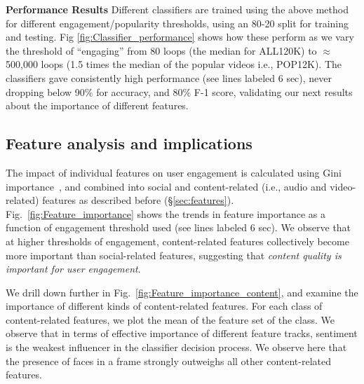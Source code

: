 \noindent\textbf{Performance Results} 
Different classifiers are trained using the above method for different engagement/popularity thresholds, using an 80-20 split for training and testing. Fig \ref{fig:Classifier_performance} shows how these perform as we vary the threshold of ``engaging'' from 80 loops (the median for ALL120K) to  $\approx$ 500,000 loops (1.5 times the median of the popular videos i.e., POP12K). The classifiers gave consistently high performance (see lines labeled 6 sec), never dropping below 90\% for accuracy, and 80\% F-1 score, validating our next results about the importance of different features. 

\subsection{Feature analysis and implications}
The impact of individual features on user engagement is calculated using Gini importance~\cite{louppe2013understanding}, and combined into social  and content-related (i.e., audio and video-related) features as described before (\S\ref{sec:features}). Fig.~\ref{fig:Feature_importance} shows the trends in  feature importance as a function of engagement threshold used (see lines labeled 6 sec). We observe that at higher thresholds of engagement, content-related features collectively become more important than social-related features, suggesting that \emph{content quality is important for user engagement}.

We drill down further in Fig.~\ref{fig:Feature_importance_content}, and examine the importance of different kinds of content-related features. For each class of content-related features, we plot the mean of the feature set of the class. We observe that in terms of effective importance of different feature tracks, sentiment is the weakest influencer in the classifier decision process.
We observe here that the presence of faces in a frame strongly outweighs all other content-related features. %

